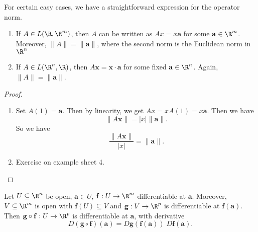 \documentclass[a4paper]{article}
\begin{document}
For certain easy cases, we have a straightforward expression for the operator norm.
\begin{prop}\leavevmode
  \begin{enumerate}
    \item If $A \in L(\R, \R^m)$, then $A$ can be written as $Ax = x \mathbf{a}$ for some $\mathbf{a} \in \R^m$. Moreover, $\|A\| = \|\mathbf{a}\|$, where the second norm is the Euclidean norm in $\R^n$
    \item If $A \in L(\R^n, \R)$, then $A \mathbf{x} = \mathbf{x} \cdot \mathbf{a}$ for some fixed $\mathbf{a} \in \R^n$. Again, $\|A\| = \|\mathbf{a}\|$.
  \end{enumerate}
\end{prop}

\begin{proof}\leavevmode
  \begin{enumerate}
    \item Set $A(1) = \mathbf{a}$. Then by linearity, we get $A x = x A(1) = x \mathbf{a}$. Then we have
      \[
        \|A \mathbf{x}\| = |x| \|\mathbf{a}\|.
      \]
      So we have
      \[
        \frac{\|A \mathbf{x}\|}{|x|} = \|\mathbf{a}\|.
      \]
    \item Exercise on example sheet 4.
  \end{enumerate}
\end{proof}

\begin{thm}
  Let $U \subseteq \R^n$ be open, $\mathbf{a} \in U$, $\mathbf{f}: U \to \R^m$ differentiable at $\mathbf{a}$. Moreover, $V \subseteq \R^m$ is open with $\mathbf{f}(U) \subseteq V$ and $\mathbf{g}: V \to \R^p$ is differentiable at $\mathbf{f}(\mathbf{a})$. Then $\mathbf{g} \circ \mathbf{f}: U \to \R^p$ is differentiable at $\mathbf{a}$, with derivative
  \[
    D(\mathbf{g} \circ \mathbf{f})(\mathbf{a}) = D \mathbf{g}(\mathbf{f}(\mathbf{a}))\; D \mathbf{f}(\mathbf{a}).
  \]
\end{thm}
\end{document}
